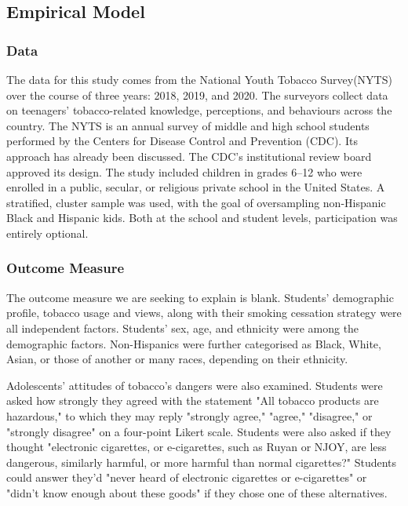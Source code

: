 \documentclass[12pt]{article}
\begin{document}
\subsection{Empirical Model}

\subsubsection{Data}

\hspace{5mm}The data for this study comes from the National Youth Tobacco Survey(NYTS) over the course of three years: 2018, 2019, and 2020. The surveyors collect data on teenagers' tobacco-related knowledge, perceptions, and behaviours across the country. The NYTS is an annual survey of middle and high school students performed by the Centers for Disease Control and Prevention (CDC). Its approach has already been discussed. The CDC's institutional review board approved its design. The study included children in grades 6–12 who were enrolled in a public, secular, or religious private school in the United States. A stratified, cluster sample was used, with the goal of oversampling non-Hispanic Black and Hispanic kids. Both at the school and student levels, participation was entirely optional.

\subsubsection{Outcome Measure}

\hspace{5mm}The outcome measure we are seeking to explain is blank. Students' demographic profile, tobacco usage and views, along with their smoking cessation strategy were all independent factors. Students' sex, age, and ethnicity were among the demographic factors. Non-Hispanics were further categorised as Black, White, Asian, or those of another or many races, depending on their ethnicity.

Adolescents' attitudes of tobacco's dangers were also examined. Students were asked how strongly they agreed with the statement "All tobacco products are hazardous," to which they may reply "strongly agree," "agree," "disagree," or "strongly disagree" on a four-point Likert scale. Students were also asked if they thought "electronic cigarettes, or e-cigarettes, such as Ruyan or NJOY, are less dangerous, similarly harmful, or more harmful than normal cigarettes?" Students could answer they'd "never heard of electronic cigarettes or e-cigarettes" or "didn't know enough about these goods" if they chose one of these alternatives.
\end{document}

